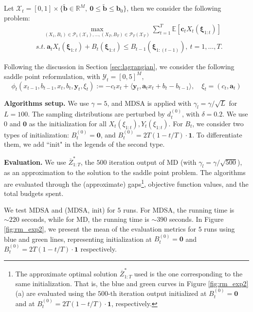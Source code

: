 \documentclass[11pt,fullpage,letterpaper]{article}
\newcommand{\mc}{\mathcal}
\newcommand{\mb}{\mathbf}
\newcommand{\R}{\mathbb{R}}
\newcommand{\E}{\mathbb{E}}
\newcommand{\bx}{\boldsymbol{\xi}}
\begin{document}
Let $\mc X_t=[0,1]\times \{\tilde{\mb b}\in \R^M,~\mb 0\leq \tilde{\mb b} \leq \mb b_0\}$, then we consider the following problem: 
\begin{align}\label{eq:rm_exp}
    &\quad \max_{(X_1,B_1)\in \mc P_1(\mc X_1),\ldots,(X_T,B_T)\in \mc P_T(\mc X_T)}\sum_{t=1}^T\E[ \mb c_tX_t(\bx_{1:t})]\\
    & s.t.~\mb a_t X_t(\bx_{1:t}) + B_t(\bx_{1:t}) \leq B_{t-1}(\bx_{1:(t-1)}),~ t=1,\ldots,T .\nonumber
\end{align}

Following the discussion in Section \ref{sec:lagrangian}, we consider the following saddle point reformulation, with $\mc Y_t = [0,5]^{M}$, 
\begin{equation}\label{eq:rm_exp_saddle}
    \phi_t(x_{t-1},b_{t-1},x_t, b_t,\mb y_t,\xi_t) := -c_tx_t  + \langle \mb y_t,\mb a_t x_t + b_t- b_{t-1}\rangle,\quad \xi_t = (c_t,\mb a_t)
\end{equation}




\textbf{Algorithms setup.} We use $\gamma = 5$, and MDSA is applied with $\gamma_l = \gamma/\sqrt{L}$ for $L=100$. The sampling distributions are perturbed by $d_t^{(0)}$, with $\delta = 0.2$. We use $0$ and $\mb 0$ as the initialization for all $X_t(\xi_{1:t}), Y_t(\xi_{1:t})$. For $B_t$, we consider two types of initialization: $B_t^{(0)} = \mb 0$, and $B_t^{(0)} = 2T(1-t/T)\cdot \mb 1$. To differentiate them, we add ``init" in the legends of the second type. 





\textbf{Evaluation.} We use $\overline{Z}^*_{1:T}$, the $500$ iteration output of MD (with $\gamma_l = \gamma/\sqrt{500}$), as an approximation to the solution to the saddle point problem. The algorithms are evaluated through the (approximate) gaps\footnote{The approximate optimal solution $\overline{Z}^*_{1:T}$ used is the one corresponding to the same initialization. That is, the blue and green curves in Figure \ref{fig:rm_exp2}(a) are evaluated using the $500$-th iteration output initialized at $B_t^{(0)} = \mb 0$ and at $B_t^{(0)} = 2T(1-t/T)\cdot \mb 1$, respectively. }, objective function values, and the total budgets spent. 

We test MDSA and (MDSA, init) for $5$ runs. For MDSA, the running time is $\sim 220$ seconds, while for MD, the running time is $\sim 390$ seconds. In Figure \ref{fig:rm_exp2}, we present the mean of the evaluation metrics for $5$ runs using blue and green lines, representing initialization at $B_t^{(0)} = \mb 0$ and $B_t^{(0)} = 2T(1-t/T)\cdot \mb 1$ respectively. 
\end{document}
